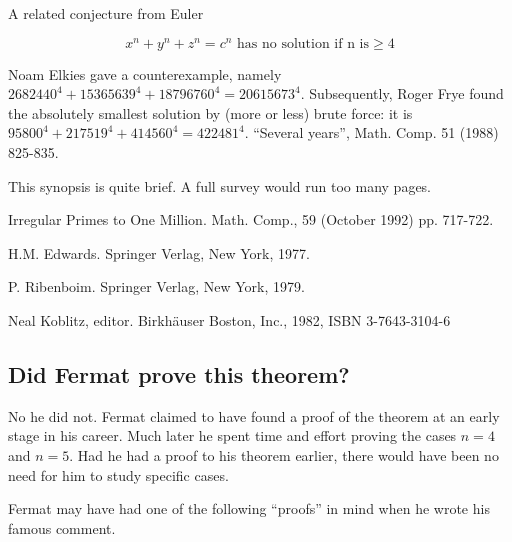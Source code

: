 A related conjecture from Euler

\[ x^n + y^n + z^n = c^n \mbox{ has no solution if n is} \geq 4 \]

Noam Elkies gave a counterexample, namely $2682440^4 + 15365639^4 +
18796760^4 = 20615673^4$. Subsequently, Roger Frye found the absolutely
smallest solution by (more or less) brute force: it is $95800^4 +
217519^4 + 414560^4 = 422481^4$.  ``Several years'', Math. Comp. 51
(1988) 825-835.
 

This synopsis is quite brief. A full survey would run too many pages.

\Ref

 {Irregular
  Primes to One Million.}  {Math. Comp.,} {59 (October 1992)
  pp. 717-722.}

 {H.M. Edwards.} {Springer Verlag, New York, 1977.}

 {P. Ribenboim.}
{Springer Verlag, New York, 1979.}

 {Neal Koblitz,
  editor.} {Birkh\"auser Boston, Inc., 1982, ISBN 3-7643-3104-6}

\subsection{Did Fermat prove this theorem?}

No he did not. Fermat claimed to have found a proof of the theorem at an
early stage in his career. Much later he spent time and effort proving
the cases $n=4$ and $n=5$. Had he had a proof to his theorem earlier,
there would have been no need for him to study specific cases.

Fermat may have had one of the following ``proofs'' in mind when he
wrote his famous comment.

